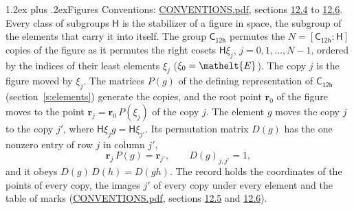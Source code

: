 \documentclass[10pt,a4paper]{article}
\makeatletter
\renewcommand\section{\@startsection{section}{1}{\z@}{-3ex plus -1ex minus -.2ex}%
  {1.2ex plus .2ex}{\normalfont\large\sffamily\bfseries\color{parttitle}}}
\numberwithin{equation}{section}
\newcommand{\eltfont}[1]{{\let\sigma\eltsigma\mathelt{#1}}}
\newcommand{\grp}[1]{\mathsf{#1}}
\newcommand{\cls}[1]{\eltfont{#1}}
\newcommand{\pointr}{\mathbf{r}}
\makeatother
\begin{document}
\section{Figures}\label{s:permutation}
Conventions: \href{../../CONVENTIONS.pdf}{CONVENTIONS.pdf}, sections \href{../../CONVENTIONS.pdf\#conv.12.4}{12.4} to \href{../../CONVENTIONS.pdf\#conv.12.6}{12.6}.
Every class of subgroups $\grp{H}$ is the stabilizer of a figure in space, the subgroup of the elements that carry it into itself. \label{n:local.orbit.size}\label{n:element.coset.least}\label{n:index.coset}The group $\grp{C_{12h}}$ permutes the $N = [\grp{C_{12h}} : \grp{H}]$ copies of the figure as it permutes the right cosets $\grp{H}\xi_j$, $j = 0, 1, \dots, N - 1$, ordered by the indices of their least elements $\xi_j$ ($\xi_0 = \cls{E}$). The copy $j$ is the figure moved by $\xi_j$. The matrices $P(g)$ of the defining representation of $\grp{C_{12h}}$ (section~\ref{s:elements}) generate the copies, and the root point $\pointr_0$ of the figure moves to the point $\pointr_j = \pointr_0\, P(\xi_j)$ of the copy $j$. \label{n:local.coset.image}The element $g$ moves the copy $j$ to the copy $j'$, where $\grp{H}\xi_j g = \grp{H}\xi_{j'}$. \label{n:local.matrix.permutation}Its permutation matrix $D(g)$ has the one nonzero entry of row $j$ in column $j'$,
\begin{equation}\label{e:perm.matrix}\pointr_j\, P(g) = \pointr_{j'}, \qquad D(g)_{j,j'} = 1,\end{equation}
and it obeys $D(g)\, D(h) = D(gh)$. The record holds the coordinates of the points of every copy, the images $j'$ of every copy under every element and the table of marks (\href{../../CONVENTIONS.pdf}{CONVENTIONS.pdf}, sections \href{../../CONVENTIONS.pdf\#conv.12.5}{12.5} and \href{../../CONVENTIONS.pdf\#conv.12.6}{12.6}).
\end{document}
